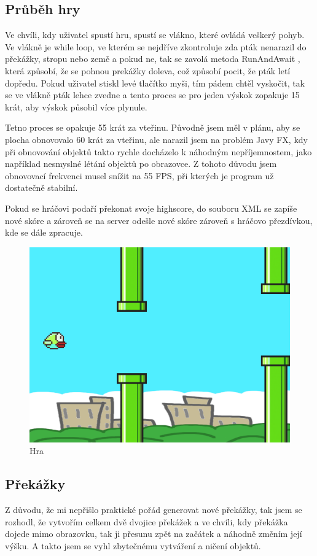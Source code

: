 \subsection{Průběh hry}
Ve chvíli, kdy uživatel spustí hru, spustí se vlákno, které ovládá veškerý pohyb. Ve vlákně je while loop, ve kterém se nejdříve zkontroluje zda pták nenarazil do překážky, stropu nebo země a pokud ne, tak se zavolá metoda RunAndAwait \cite{runAndAwait}, která způsobí, že se pohnou prekážky doleva, což způsobí pocit, že pták letí dopředu. Pokud uživatel stiskl levé tlačítko myši, tím pádem chtěl vyskočit, tak se ve vlákně pták lehce zvedne a tento proces se pro jeden výskok zopakuje 15 krát, aby výskok působil více plynule. 

Tetno proces se opakuje 55 krát za vteřinu. Původně jsem měl v plánu, aby se plocha obnovovalo 60 krát za vteřinu, ale narazil jsem na problém Javy FX, kdy při obnovování objektů takto rychle docházelo k náhodným nepříjemnostem, jako například nesmyslné létání objektů po obrazovce. Z tohoto důvodu jsem obnovovací frekvenci musel snížit na 55 FPS, při kterých je program už dostatečně stabilní.

Pokud se hráčovi podaří překonat svoje highscore, do souboru XML se zapíše nové skóre a zároveň se na server odešle nové skóre zároveň s hráčovo přezdívkou, kde se dále zpracuje. 

\begin{figure}[ht!]
    \centering
    \includegraphics[scale=0.3]{images/game.png}
    \caption{Hra}
\end{figure}

\subsection{Překážky}
Z důvodu, že mi nepřišlo praktické pořád generovat nové překážky, tak jsem se rozhodl, že vytvořím celkem dvě dvojice překážek a ve chvíli, kdy překážka dojede mimo obrazovku, tak ji přesunu zpět na začátek a náhodně změním její výšku. A takto jsem se vyhl zbytečnému vytváření a ničení objektů. 


